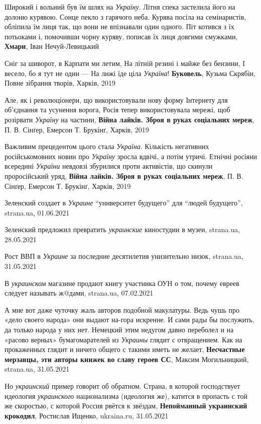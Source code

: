 Широкий і вольний був їм шлях на \emph{Україну}. Літня спека застелила його на
долоню курявою. Сонце пекло з гарячого неба. Курява посіла на семінаристів,
обліпила їм лиця так, що вони не впізнавали один одного. Піт котився з їх
потьоками і, помочивши чорну куряву, пописав їх лиця довгими смужками,
\textbf{Хмари}, Іван Нечуй-Левицький

Сніг за шиворот, в Карпати ми летим, На літній резині і майже без бензини, І
весело, бо я тут не один — На лижі їде ціла \emph{Україна}!  \textbf{Буковель},
Кузьма Скрябін, Повне зібрання творів, Харків, 2019

Але, як і революціонери, що використовували нову форму Інтернету для об'єднання
та усунення ворога, Росія тепер використовувала мережі, щоб розірвати
\emph{Україну} на частини, \textbf{Війна лайків. Зброя в руках соціальних
мереж}, П. В.  Сінґер, Емерсон Т. Брукінґ, Харків, 2019

Важливим прецедентом цього стала \emph{Україна}. Кількість негативних
російськомовних новин про \emph{Україну} зросла вдвічі, а потім утричі. Етнічні
росіяни всередині \emph{України} невдовзі збурилися проти активістів, що
скинули проросійський уряд, \textbf{Війна лайків. Зброя в руках соціальних
мереж}, П. В. Сінґер, Емерсон Т. Брукінґ, Харків, 2019

Зеленский создает в \emph{Украине} \enquote{университет будущего} для \enquote{людей
будущего}, strana.ua, 01.06.2021

Зеленский предложил превратить \emph{украинские} киностудии в музеи, strana.ua,
28.05.2021

Рост ВВП в \emph{Украине} за последние десятилетия унизительно низок,
strana.ua, 31.05.2021

В \emph{украинском} магазине продают книгу участника ОУН о том, почему евреев следует
называть ж@дами, strana.ua, 07.02.2021

А мне вот даже чуточку жаль авторов подобной макулатуры. Ведь чушь про «дело
своего народа» они выдают на-гора искренне. И сами рады бы послужить, да только
народа у них нет. Немецкий этим недугом давно переболел и на «расово верных»
бумагомарателей из \emph{Украины} глядит с отвращением. Как на прокаженных
глядит и ничего общего с такими иметь не желает, \textbf{Несчастные мерзавцы,
эти авторы книжек во славу героев СС}, Максим Могильницкий, strana.ua,
31.05.2021

Но \emph{украинский} пример говорит об обратном. Страна, в которой господствует
идеология \emph{украинского} национализма (идеология же), катится в пропасть с
той же скоростью, с которой Россия рвётся к звёздам, \textbf{Непойманный
украинский крокодил}, Ростислав Ищенко, ukraina.ru, 31.05.2021

